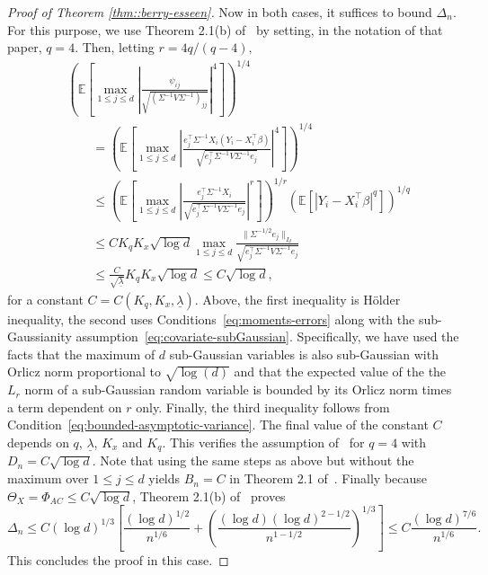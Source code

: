 \documentclass[11pt]{article}
\begin{document}
\begin{appendices}
\begin{proof}[Proof of Theorem \ref{thm::berry-esseen}]
Now in both cases, it suffices to bound $\Delta_n$. For this purpose, we use Theorem 2.1(b) of~\cite{koike2019notes} by setting, in the notation of that paper, $q = 4$. Then, letting $r = 4q/(q-4),$ 
\begin{align*}\textbf{}
&\left(\mathbb{E}\left[\max_{1\le j\le d}\left|\frac{\psi_{ij}}{\sqrt{(\Sigma^{-1}V\Sigma^{-1})_{jj}}}\right|^4\right]\right)^{1/4}\\ 
&\qquad= \left(\mathbb{E}\left[\max_{1\le j\le d}\left|\frac{e_j^{\top}\Sigma^{-1}X_i(Y_i - X_i^{\top}\beta)}{\sqrt{e_j^{\top}\Sigma^{-1}V\Sigma^{-1}e_j}}\right|^4\right]\right)^{1/4}\\
&\qquad\le \left(\mathbb{E}\left[\max_{1\le j\le d}\left|\frac{e_j^{\top}\Sigma^{-1}X_i}{\sqrt{e_j^{\top}\Sigma^{-1}V\Sigma^{-1}e_j}}\right|^{r}\right]\right)^{1/r}\left(\mathbb{E}[|Y_i - X_i^{\top}\beta|^q]\right)^{1/q}\\
&\qquad\le CK_qK_x\sqrt{\log d}\max_{1\le j\le d}\frac{\|\Sigma^{-1/2}e_j\|_{I_d}}{\sqrt{e_j^{\top}\Sigma^{-1}V\Sigma^{-1}e_j}}\\
&\qquad\le \frac{C}{\sqrt{\underline{\lambda}}}K_qK_x\sqrt{\log d} \le C\sqrt{\log d},
\end{align*}
for a constant $C = C(K_q, K_x, \underline{\lambda})$. Above, the first inequality is H\"{o}lder inequality, the second uses Conditions~\ref{eq:moments-errors} along with the sub-Gaussianity assumption~\ref{eq:covariate-subGaussian}. Specifically, we have used the facts that the maximum of $d$ sub-Gaussian variables is also sub-Gaussian with Orlicz norm proportional to $\sqrt{\log(d)}$ and that the expected value of the the $L_r$ norm of a sub-Gaussian random variable is bounded by its Orlicz norm times a term dependent on $r$ only.  Finally, the third inequality  follows from Condition~\ref{eq:bounded-asymptotic-variance}. The final value of the constant $C$ depends on $q$, $\underline{\lambda}$, $K_x$ and $K_q$. This verifies the assumption of~\citet[Theorem 2.1(b)]{koike2019notes} for $q = 4$ with $D_n = C\sqrt{\log d}$. Note that using the same steps as above but without the maximum over $1\le j\le d$ yields $B_n = C$ in Theorem 2.1 of~\cite{koike2019notes}. Finally because $\Theta_X = \Phi_{AC} \le C\sqrt{\log d}$, Theorem 2.1(b) of~\cite{koike2019notes} proves
\[
\Delta_n \le C(\log d)^{1/3}\left[\frac{(\log d)^{1/2}}{n^{1/6}} + \left(\frac{(\log d)(\log d)^{2 - 1/2}}{n^{1 - 1/2}}\right)^{1/3}\right] \le C\frac{(\log d)^{7/6}}{n^{1/6}}.
\]
This concludes the proof in this case.
\end{proof}



\end{appendices}
\end{document}

